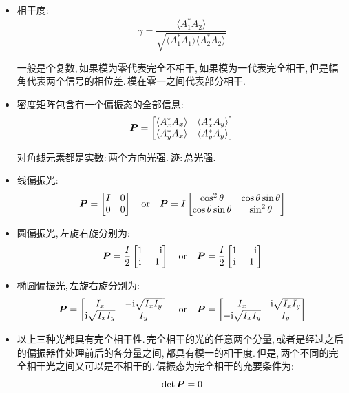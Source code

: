 \begin{itemize}
\item 相干度:
\[\gamma=\frac{\langle A_1^\ast A_2 \rangle}{\sqrt{\langle A_1^\ast A_1\rangle\langle A_2^\ast A_2\rangle}}\]

一般是个复数,\,如果模为零代表完全不相干,\,如果模为一代表完全相干,\,但是幅角代表两个信号的相位差.\,模在零一之间代表部分相干.

\item 密度矩阵包含有一个偏振态的全部信息:
\[\boldsymbol{P}=\begin{bmatrix}
\langle A_x^\ast A_x \rangle & \langle A_x^\ast A_y \rangle\\
\langle A_y^\ast A_x \rangle & \langle A_y^\ast A_y \rangle
\end{bmatrix}\]

对角线元素都是实数:\,两个方向光强.\,迹:\,总光强.

\item 线偏振光:
\[\boldsymbol{P}=\begin{bmatrix}
I & 0\\
0 & 0
\end{bmatrix} \quad {\rm or}\quad \boldsymbol{P}=I\begin{bmatrix}
\cos^2\theta & \cos\theta\sin\theta\\
\cos\theta\sin\theta & \sin^2\theta
\end{bmatrix}\]

\item 圆偏振光,\,左旋右旋分别为:
\[\boldsymbol{P}=\frac{I}{2}\begin{bmatrix}
1 & -{\rm i}\\
{\rm i} & 1
\end{bmatrix} \quad {\rm or}\quad \boldsymbol{P}=\frac{I}{2}\begin{bmatrix}
1 & -{\rm i}\\
{\rm i} & 1
\end{bmatrix}\]

\item 椭圆偏振光,\,左旋右旋分别为:
\[ \boldsymbol{P}=\begin{bmatrix}
I_x & -{\rm i} \sqrt{I_xI_y}\\
{\rm i} \sqrt{I_xI_y} & I_y
\end{bmatrix}\quad {\rm or}\quad \boldsymbol{P}=\begin{bmatrix}
I_x & {\rm i} \sqrt{I_xI_y}\\
-{\rm i} \sqrt{I_xI_y} & I_y
\end{bmatrix}\]

\item 以上三种光都具有完全相干性.\,完全相干的光的任意两个分量,\,或者是经过之后的偏振器件处理前后的各分量之间,\,都具有模一的相干度.\,但是,\,两个不同的完全相干光之间又可以是不相干的.\,偏振态为完全相干的充要条件为:
\[\det \boldsymbol{P}=0\]


\end{itemize}
